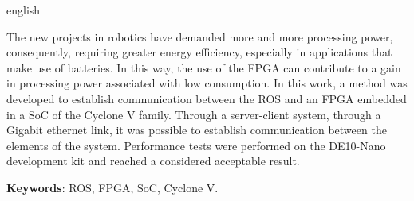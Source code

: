 \begin{resumo}[Abstract]
 \begin{otherlanguage*}{english}

  The new projects in robotics have demanded more and more processing power, consequently, requiring greater energy efficiency, especially in applications that make use of batteries.
  In this way, the use of the FPGA can contribute to a gain in processing power associated with low consumption. In this work, a method was developed to establish communication between the ROS and an FPGA embedded in a SoC of the Cyclone V family. Through a server-client system, through a Gigabit ethernet link, it was possible to establish communication between the elements of the system. Performance tests were performed on the DE10-Nano development kit and reached a considered acceptable result.


   \vspace{\onelineskip}
 
   \noindent 
   \textbf{Keywords}: ROS, FPGA, SoC, Cyclone V.
 \end{otherlanguage*}
\end{resumo}

% 

%  
